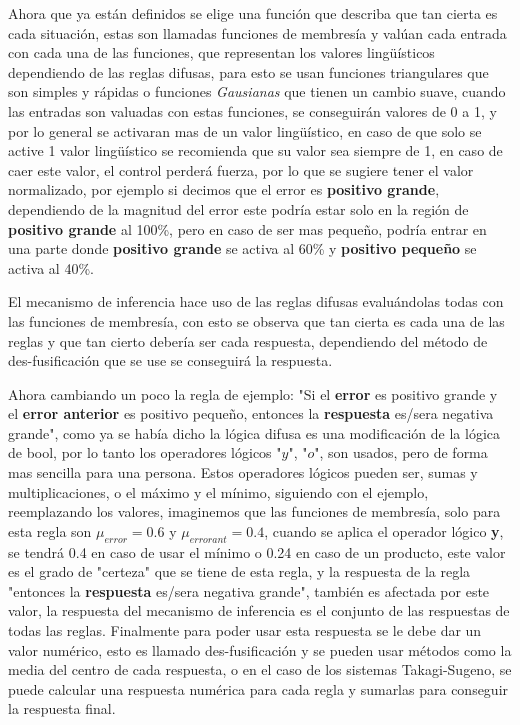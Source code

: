 Ahora que ya están definidos se elige una función que describa que tan cierta es cada situación, estas son llamadas funciones de membresía y valúan cada entrada con cada una de las funciones, que representan los valores lingüísticos dependiendo de las reglas difusas, para esto se usan funciones triangulares que son simples y rápidas o funciones \textit{Gausianas} que tienen un cambio suave, cuando las entradas son valuadas con estas funciones, se conseguirán valores de 0 a 1, y por lo general se activaran mas de un valor lingüístico, en caso de que solo se active 1 valor lingüístico se recomienda que su valor sea siempre de 1, en caso de caer este valor, el control perderá fuerza, por lo que se sugiere tener el valor normalizado, por ejemplo si decimos que el error es \textbf{positivo grande}, dependiendo de la magnitud del error este podría estar solo en la región de \textbf{positivo grande} al 100\%, pero en caso de ser mas pequeño, podría entrar en una parte donde \textbf{positivo grande} se activa al 60\% y \textbf{positivo pequeño} se activa al 40\%.

El mecanismo de inferencia hace uso de las reglas difusas evaluándolas todas con las funciones de membresía, con esto se observa que tan cierta es cada una de las reglas y que tan cierto debería ser cada respuesta, dependiendo del método de des-fusificación que se use se conseguirá la respuesta.

Ahora cambiando un poco la regla de ejemplo: "Si el \textbf{error} es positivo grande y el \textbf{error anterior} es positivo pequeño, entonces la \textbf{respuesta} es/sera negativa grande", como ya se había dicho la lógica difusa es una modificación de la lógica de bool, por lo tanto los operadores lógicos "$y$", "$o$", son usados, pero de forma mas sencilla para una persona. Estos operadores lógicos pueden ser, sumas y multiplicaciones, o el máximo y el mínimo, siguiendo con el ejemplo, reemplazando los valores, imaginemos que las funciones de membresía, solo para esta regla son $\mu_{error}=0.6$ y $\mu_{errorant}=0.4$, cuando se aplica el operador lógico \textbf{y}, se tendrá 0.4 en caso de usar el mínimo o 0.24 en caso de un producto, este valor es el grado de "certeza" que se tiene de esta regla, y la respuesta de la regla "entonces la \textbf{respuesta} es/sera negativa grande", también es afectada por este valor, la respuesta del mecanismo de inferencia es el conjunto de las  respuestas de todas las reglas.
Finalmente para poder usar esta respuesta se le debe dar un valor numérico, esto es llamado des-fusificación y se pueden usar métodos como la media del centro de cada respuesta, o en el caso de los sistemas Takagi-Sugeno, se puede calcular una respuesta numérica para cada regla y sumarlas para conseguir la respuesta final.


